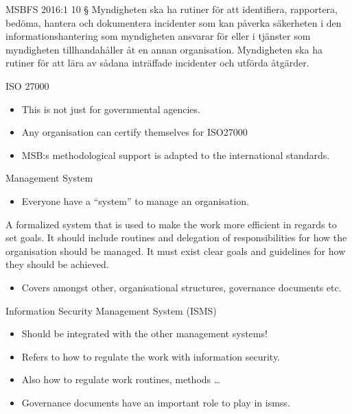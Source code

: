 \documentclass{beamer}
\begin{document}
\begin{frame}{MSBFS 2016:1}
  10 § Myndigheten ska ha rutiner för att identifiera, rapportera, bedöma,
  hantera och dokumentera incidenter som kan påverka säkerheten i den
  informationshantering som myndigheten ansvarar för eller i tjänster som
  myndigheten tillhandahåller åt en annan organisation. Myndigheten ska ha
  rutiner för att lära av sådana inträffade incidenter och utförda åtgärder. 
\end{frame}

\begin{frame}{ISO 27000}
  \begin{itemize}
    \item This is not just for governmental agencies.

    \item Any organisation can certify themselves for ISO27000

    \item MSB:s methodological support is adapted to the international
      standards.

  \end{itemize}
\end{frame}

\begin{frame}{Management System}
  \begin{itemize}
    \item Everyone have a \enquote{system} to manage an organisation.
  \end{itemize}
      A formalized system that is used to make the work more efficient in
      regards to set goals. It should include routines and delegation of
      responsibilities for how the organisation should be managed. It must exist
      clear goals and guidelines for how they should be achieved.
  \begin{itemize}
    \item Covers amongst other, organisational structures, governance documents
      etc.
  \end{itemize}
\end{frame}

\begin{frame}{Information Security Management System (ISMS)}
  \begin{itemize}
    \item Should be integrated with the other management systems!
    \item Refers to how to regulate the work with information security.
    \item Also how to regulate work routines, methods \dots
    \item Governance documents have an important role to play in \acp{isms}\@.
  \end{itemize}
\end{frame}
\end{document}
